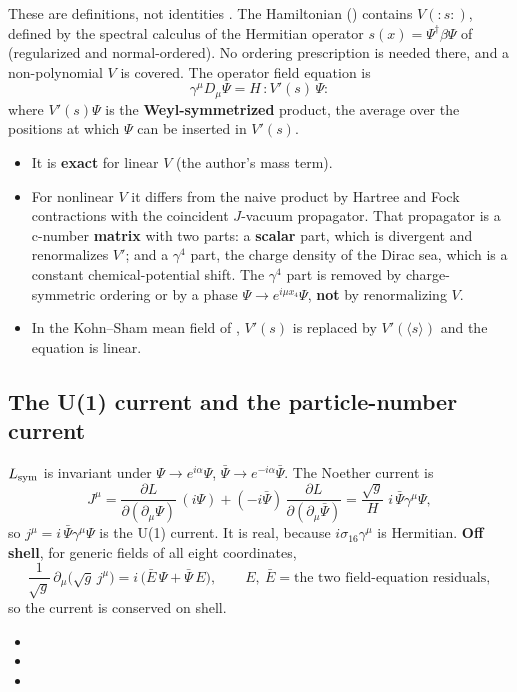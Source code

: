 These are definitions, not identities . The Hamiltonian ()
contains $V(:\!s\!:)$, defined by the spectral calculus of the Hermitian operator
$s(x)=\Psi^{\dagger}\beta\Psi$ of  (regularized and normal-ordered). No ordering
prescription is needed there, and a non-polynomial $V$ is covered. The operator field equation is
\[
  \gamma^\mu D_\mu\Psi=H\,{:}V'(s)\,\Psi{:}
\]
where $V'(s)\Psi$ is the \textbf{Weyl-symmetrized} product, the average over the positions at which
$\Psi$ can be inserted in $V'(s)$.
\begin{itemize}
  \item It is \textbf{exact} for linear $V$ (the author's mass term).
  \item For nonlinear $V$ it differs from the naive product by Hartree and Fock contractions with the
        coincident $J$-vacuum propagator. That propagator is a c-number \textbf{matrix} with two
        parts: a \textbf{scalar} part, which is divergent and renormalizes $V'$; and a
        $\gamma^4$ part, the charge density of the Dirac sea, which is a constant
        chemical-potential shift. The $\gamma^4$ part is removed by charge-symmetric ordering or by
        a phase $\Psi\to e^{i\mu x_4}\Psi$, \textbf{not} by renormalizing $V$.
  \item In the Kohn--Sham mean field of , $V'(s)$ is replaced by $V'(\langle s\rangle)$
        and the equation is linear.
\end{itemize}

\subsection{The U(1) current and the particle-number current}
\label{sec:5.10}

$L_{\mathrm{sym}}$ is invariant under $\Psi\to e^{i\alpha}\Psi$, $\bar\Psi\to e^{-i\alpha}\bar\Psi$. The Noether
current is
\[
  J^\mu=\frac{\partial L}{\partial(\partial_\mu\Psi)}\,(i\Psi)+(-i\bar\Psi)\,\frac{\partial L}{\partial(\partial_\mu\bar\Psi)}
  =\frac{\sqrt g}{H}\;i\,\bar\Psi\gamma^\mu\Psi ,
\]
so $j^\mu=i\,\bar\Psi\gamma^\mu\Psi$ is the U(1) current. It is real, because $i\sigma_{16}\gamma^\mu$ is
Hermitian. \textbf{Off shell}, for generic fields of all eight coordinates,
\[
  \frac{1}{\sqrt g}\,\partial_\mu\bigl(\sqrt g\,j^\mu\bigr)=i\,\bigl(\bar E\,\Psi+\bar\Psi\,E\bigr),
  \qquad E,\ \bar E=\text{the two field-equation residuals},
\]
so the current is conserved on shell. 
\begin{itemize}
  \item {}
  \item {}
  \item {}
\end{itemize}

